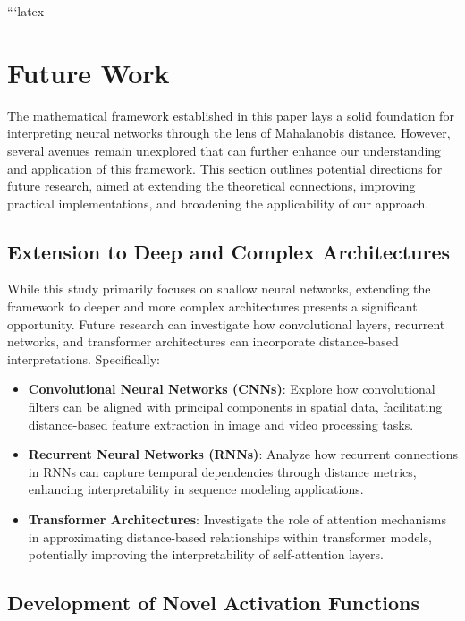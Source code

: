 ```latex

\section{Future Work}
\label{sec:future_work}

The mathematical framework established in this paper lays a solid foundation for interpreting neural networks through the lens of Mahalanobis distance. However, several avenues remain unexplored that can further enhance our understanding and application of this framework. This section outlines potential directions for future research, aimed at extending the theoretical connections, improving practical implementations, and broadening the applicability of our approach.

\subsection{Extension to Deep and Complex Architectures}

While this study primarily focuses on shallow neural networks, extending the framework to deeper and more complex architectures presents a significant opportunity. Future research can investigate how convolutional layers, recurrent networks, and transformer architectures can incorporate distance-based interpretations. Specifically:
\begin{itemize}
    \item \textbf{Convolutional Neural Networks (CNNs)}: Explore how convolutional filters can be aligned with principal components in spatial data, facilitating distance-based feature extraction in image and video processing tasks.
    \item \textbf{Recurrent Neural Networks (RNNs)}: Analyze how recurrent connections in RNNs can capture temporal dependencies through distance metrics, enhancing interpretability in sequence modeling applications.
    \item \textbf{Transformer Architectures}: Investigate the role of attention mechanisms in approximating distance-based relationships within transformer models, potentially improving the interpretability of self-attention layers.
\end{itemize}

\subsection{Development of Novel Activation Functions}

